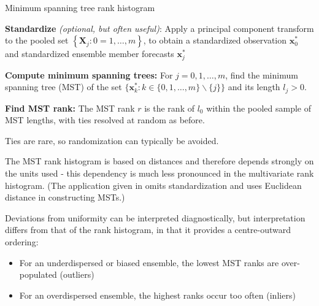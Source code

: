 \documentclass[10pt,fleqn]{article}
\begin{document}
\begin{algorithm}%
    \caption{Minimum spanning tree rank histogram}
	\label{alg:mv-rank-hist}
\vspace{5pt}




\textbf{Standardize} \textit{(optional, but often useful)}:
Apply a principal component transform to the pooled set $\left\{ \mathbf{X}_j:0=1, \dots, m \right\}$, to obtain a standardized observation $\mathbf{x}_0^*$ and standardized ensemble member forecasts $\mathbf{x}_j^*$
%
\vspace{5pt}


\textbf{Compute minimum spanning trees:}
For $j = 0, 1, \dots, m$, find the minimum spanning tree (MST) of the set $\{ \mathbf{x}_k^*: k \in \{ 0,1, \dots, m\} \backslash \{j\}\}$ and its length $l_j > 0$.
%
\vspace{5pt}


\textbf{Find MST rank:} The MST rank $r$ is the rank of $l_0$ within the pooled sample of MST lengths, with ties resolved at random as before.
\vspace{5pt}

\end{algorithm}

Ties are rare, so randomization can typically be avoided. 

The MST rank histogram is based on distances and therefore depends strongly on the units used - this dependency is much less pronounced in the multivariate rank histogram. (The application given in \cite{Gneiting2008} omits standardization and uses Euclidean distance in constructing MSTs.)

Deviations from uniformity can be interpreted diagnostically, but interpretation differs from that of the rank histogram, in that it provides a centre-outward ordering:
%
\begin{itemize}

\item For an underdispersed or biased ensemble, the lowest MST ranks are over-populated (outliers)

\item For an overdispersed ensemble, the highest ranks occur too often (inliers)

\end{itemize}
\end{document}
